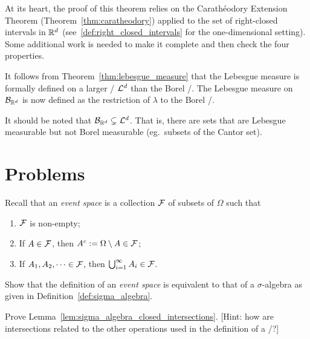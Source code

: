 At its heart, the proof of this theorem relies on the Carath\'{e}odory Extension Theorem (Theorem~\ref{thm:caratheodory}) applied to the set of right-closed intervals in $\mathbb R^d$ (see~\eqref{def:right_closed_intervals} for the one-dimensional setting). Some additional work is needed to make it complete and then check the four properties. 


It follows from Theorem~\ref{thm:lebesgue_measure} that the Lebesgue measure is formally defined on a larger \sigalg/ $\mathcal L^d$ than the Borel \sigalg/. 
The Lebesgue measure on $\mathcal B_{\mathbb R^d}$ is now defined as the restriction of $\lambda$ to the Borel \sigalg/. 

\begin{remark}
It should be noted that $\mathcal B_{\mathbb R^d} \subsetneq \mathcal L^d$. That is, there are sets that are Lebesgue measurable but not Borel measurable (eg.\ subsets of the Cantor set).
\end{remark}


\section{Problems}

\begin{problem}\label{prb:event_space_are_sigma_algebras}
Recall that an \emph{event space} is a collection $\mathcal F$ of subsets of $\Omega$ such that
\begin{enumerate}[label=(\alph*)]
\item $\mathcal F$ is non-empty;
\item If $A \in \mathcal F$, then $A^c := \Omega \setminus A \in \mathcal F$;
\item If $A_1, A_2, \dots \in \mathcal F$, then $\bigcup_{i = 1}^\infty A_i \in \mathcal F$.
\end{enumerate}
Show that the definition of an \emph{event space} is equivalent to that of a $\sigma$-algebra as given in Definition~\ref{def:sigma_algebra}.
\end{problem}

\begin{problem}\label{prb:sigma_algebra_closed_intersections}
Prove Lemma~\ref{lem:sigma_algebra_closed_intersections}. [Hint: how are intersections related to the other operations used in the definition of a \sigalg/?]
\end{problem}

